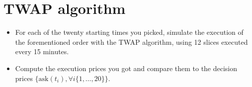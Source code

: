 \section{TWAP algorithm}

\begin{itemize}
    \item For each of the twenty starting times you picked, simulate the execution of the forementioned order with the TWAP algorithm, using 12 slices executed every 15 minutes.
    \item Compute the execution prices you got and compare them to the decision prices $\{\mathrm{ask}(t_i), \forall i \{1, \dots, 20\} \}$.
\end{itemize}



